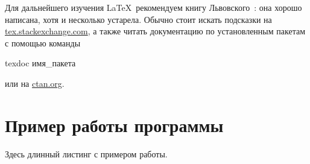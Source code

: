 Для дальнейшего изучения \LaTeX\ рекомендуем книгу Львовского~\autocite{Lvo2003}: она хорошо написана, хотя и несколько устарела.
Обычно стоит искать подсказки на
\href{http://tex.stackexchange.com/}{tex.stackexchange.com}, а также
читать документацию по установленным пакетам с помощью
команды
\begin{Verb}
texdoc имя_пакета
\end{Verb}
или на \href{http://ctan.org/}{ctan.org}.

\printbibliography[%
    heading=bibintoc%
]

\appendix
{}

\section{Пример работы программы}

Здесь длинный листинг с примером работы.


